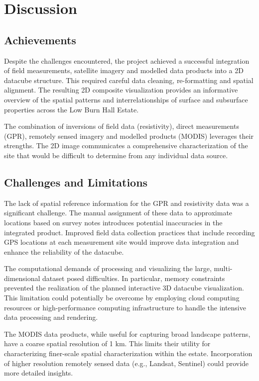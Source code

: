 \documentclass{article}
\begin{document}
\section{Discussion}

\subsection{Achievements}

Despite the challenges encountered, the project achieved a successful integration of field measurements, satellite imagery and modelled data products into a 2D datacube structure. This required careful data cleaning, re-formatting and spatial alignment. The resulting 2D composite visualization provides an informative overview of the spatial patterns and interrelationships of surface and subsurface properties across the Low Burn Hall Estate.

The combination of inversions of field data (resistivity), direct measurements (GPR), remotely sensed imagery and modelled products (MODIS) leverages their strengths. The 2D image communicates a comprehensive characterization of the site that would be difficult to determine from any individual data source.

\subsection{Challenges and Limitations}

The lack of spatial reference information for the GPR and resistivity data was a significant challenge. The manual assignment of these data to approximate locations based on survey notes introduces potential inaccuracies in the integrated product. Improved field data collection practices that include recording GPS locations at each measurement site would improve data integration and enhance the reliability of the datacube.

The computational demands of processing and visualizing the large, multi-dimensional dataset posed difficulties. In particular, memory constraints prevented the realization of the planned interactive 3D datacube visualization. This limitation could potentially be overcome by employing cloud computing resources or high-performance computing infrastructure to handle the intensive data processing and rendering.

The MODIS data products, while useful for capturing broad landscape patterns, have a coarse spatial resolution of 1 km. This limits their utility for characterizing finer-scale spatial characterization within the estate. Incorporation of higher resolution remotely sensed data (e.g., Landsat, Sentinel) could provide more detailed insights.
\end{document}
